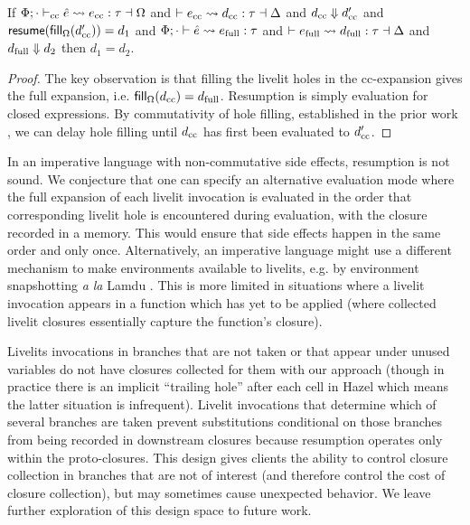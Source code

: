 \begin{theorem}
    If $\Phi; \cdot \vdash_\text{cc} \hat e \leadsto e_\text{cc} : \tau \dashv \Omega$ and $\vdash e_\text{cc} \leadsto d_\text{cc} : \tau \dashv \Delta$
    and $d_\text{cc} \Downarrow d_\text{cc}'$ and $\mathsf{resume}(\mathsf{fill}_{\Omega}(d_\text{cc}')) = d_1$
    and $\Phi; \cdot \vdash \hat e \leadsto e_\text{full} : \tau$
    and $\vdash e_\text{full} \leadsto d_\text{full} : \tau \dashv \Delta$
    and $d_\text{full} \Downarrow d_2$ then $d_1 = d_2$.
\end{theorem}
\begin{proof}
    The key observation is that filling the livelit holes in the cc-expansion gives the full expansion,
    i.e. $\mathsf{fill}_{\Omega}(d_\text{cc}) = d_\text{full}$. Resumption is simply evaluation for closed expressions.
    By commutativity of hole filling, established in the prior work \cite{HazelnutLive},
    we can delay hole filling until $d_\text{cc}$ has first been evaluated to
    $d_\text{cc}'$.
\end{proof}

In an imperative language with non-commutative side effects, resumption is not sound. We conjecture that one can specify an 
alternative evaluation mode where the full expansion of each livelit invocation is evaluated 
in the order that corresponding livelit hole is encountered during evaluation, with the closure recorded in a memory. 
This would ensure that
side effects happen in the same order and only once. 
Alternatively, an imperative language might use a different mechanism to make
environments available to livelits, e.g. by environment snapshotting \emph{a la} Lamdu \cite{lamdu}.
This is more limited in situations where a livelit invocation appears in a function which has yet to be applied
 (where collected livelit closures essentially 
 capture the function's closure). 

Livelits invocations in branches that are not taken or that appear under unused variables do not have closures collected for them with our approach
(though in practice there is an implicit ``trailing hole'' after each cell in Hazel which means the latter situation is infrequent). 
Livelit invocations that determine which of several branches are taken prevent substitutions conditional on those branches from being recorded in 
downstream closures because resumption operates only within the proto-closures. 
This design gives clients the ability to control closure collection in branches that are not of interest (and therefore control the cost of closure collection), 
but may sometimes cause unexpected behavior. 
We leave further exploration of this design space 
to future work.

